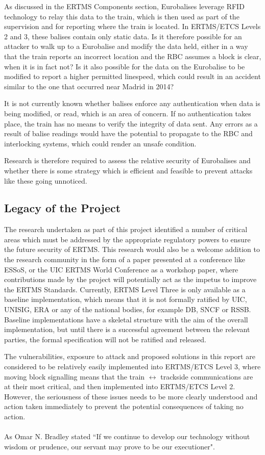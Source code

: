 \documentclass[twoside,11pt,a4paper]{article}
\begin{document}
As discussed in the ERTMS Components section, Eurobalises leverage RFID technology to relay this data to the train, which is then used as part of the supervision and for reporting where the train is located. In ERTMS/ETCS Levels 2 and 3, these balises contain only static data. Is it therefore possible for an attacker to walk up to a Eurobalise and modify the data held, either in a way that the train reports an incorrect location and the RBC assumes a block is clear, when it is in fact not? Is it also possible for the data on the Eurobalise to be modified to report a higher permitted linespeed, which could result in an accident similar to the one that occurred near Madrid in 2014?

It is not currently known whether balises enforce any authentication when data is being modified, or read, which is an area of concern. If no authentication takes place, the train has no means to verify the integrity of data sent. Any errors as a result of balise readings would have the potential to propagate to the RBC and interlocking systems, which could render an unsafe condition.

Research is therefore required to assess the relative security of Eurobalises and whether there is some strategy which is efficient and feasible to prevent attacks like these going unnoticed.

\subsection{Legacy of the Project}
The research undertaken as part of this project identified a number of critical areas which must be addressed by the appropriate regulatory powers to ensure the future security of ERTMS. This research would also be a welcome addition to the research community in the form of a paper presented at a conference like ESSoS, or the UIC ERTMS World Conference as a workshop paper, where contributions made by the project will potentially act as the impetus to improve the ERTMS Standards. Currently, ERTMS Level Three is only available as a baseline implementation, which means that it is not formally ratified by UIC, UNISIG, ERA or any of the national bodies, for example DB, SNCF or RSSB. Baseline implementations have a skeletal structure with the aim of the overall implementation, but until there is a successful agreement between the relevant parties, the formal specification will not be ratified and released.

The vulnerabilities, exposure to attack and proposed solutions in this report are considered to be relatively easily implemented into ERTMS/ETCS Level 3, where moving block signalling means that the train $\leftrightarrow$ trackside communications are at their most critical, and then implemented into ERTMS/ETCS Level 2. However, the seriousness of these issues needs to be more clearly understood and action taken immediately to prevent the potential consequences of taking no action.\\\\As Omar N. Bradley stated ``If we continue to develop our technology without wisdom or prudence, our servant may prove to be our executioner".\\
\end{document}
